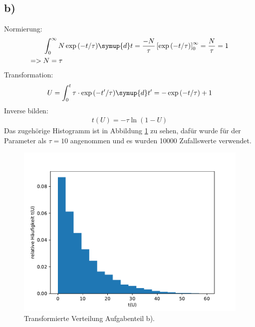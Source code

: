 \subsection{b)}
Normierung:
\begin{align*}
  &\int_0^{\infty}N \exp{(-t/\tau)} \symup{d}t = \frac{-N}{\tau} \left[\exp{(-t/\tau)}\right]_0^{\infty} = \frac{N}{\tau} =1 \\
  => \; &N = \tau
\end{align*}
Transformation:
\begin{align*}
  U = \int_0^{t} \tau \cdot \exp{(-t'/\tau)} \symup{d}t' = -\exp{(-t/\tau)}+1 \\
\end{align*}
Inverse bilden:
\begin{align*}
  t(U) = - \tau \ln{(1-U)}
\end{align*}
Das zugehörige Histogramm ist in Abbildung \ref{5.b} zu sehen, dafür wurde für der Parameter als $\tau = 10$ angenommen und es
wurden 10000 Zufallswerte verwendet.
\begin{figure}[h]
  \centering
  \includegraphics[scale=0.7]{Aufgabe05/Transformierte2.pdf}
  \caption{Transformierte Verteilung Aufgabenteil b).}
  \label{5.b}
\end{figure}

